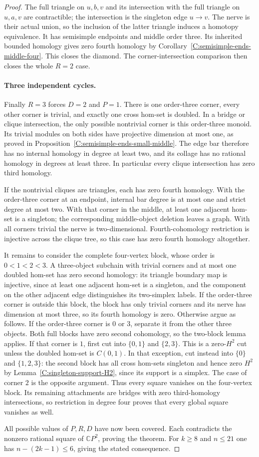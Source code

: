 \begin{proof}
The full triangle on $u,b,v$ and its intersection
with the full triangle on $u,a,v$ are contractible;
the intersection is the singleton edge $u\to v$.
The nerve is their actual union, so the inclusion of
the latter triangle induces a homotopy equivalence.
It has semisimple endpoints and middle order three.
Its inherited bounded homology gives zero fourth
homology by Corollary~\ref{C:semisimple-ends-middle-four}.
This closes the diamond.  The corner-intersection
comparison then closes the whole $R=2$ case.

\paragraph{Three independent cycles.}
Finally $R=3$ forces $D=2$ and $P=1$.  There is one
order-three corner, every other corner is trivial,
and exactly one cross hom-set is doubled.  In a
bridge or clique intersection, the only possible
nontrivial corner is this order-three monoid.
Its trivial modules on both sides have projective
dimension at most one, as proved in
Proposition~\ref{C:semisimple-ends-small-middle}.
The edge bar therefore has no internal homology in
degree at least two, and its collage has no rational
homology in degrees at least three.  In particular
every clique intersection has zero third homology.

If the nontrivial cliques are triangles, each has
zero fourth homology.  With the order-three corner
at an endpoint, internal bar degree is at most one
and strict degree at most two.  With that corner
in the middle, at least one adjacent hom-set is a
singleton; the corresponding middle-object deletion
leaves a graph.  With all corners trivial the nerve
is two-dimensional.  Fourth-cohomology restriction
is injective across the clique tree, so this case
has zero fourth homology altogether.

It remains to consider the complete four-vertex
block, whose order is $0<1<2<3$.  A three-object
subchain with trivial corners and at most one doubled
hom-set has zero second homology: its triangle
boundary map is injective, since at least one
adjacent hom-set is a singleton, and the component
on the other adjacent edge distinguishes its
two-simplex labels.
If the order-three corner is outside this block, the
block has only trivial corners and its nerve has
dimension at most three, so its fourth homology is zero.
Otherwise argue as follows.
If the order-three corner is $0$ or $3$, separate
it from the other three objects.  Both full blocks
have zero second cohomology, so the two-block lemma
applies.
If that corner is $1$, first cut into $\{0,1\}$ and
$\{2,3\}$.  This is a zero-$H^2$ cut unless the
doubled hom-set is $C(0,1)$.  In that exception, cut
instead into $\{0\}$ and $\{1,2,3\}$: the second
block has all cross hom-sets singleton and hence
zero $H^2$ by Lemma~\ref{C:singleton-support-H2},
since its support is a simplex.  The case of corner
$2$ is the opposite argument.  Thus every square
vanishes on the four-vertex block.  Its remaining
attachments are bridges with zero third-homology
intersections, so restriction in degree four proves
that every global square vanishes as well.

All possible values of $P,R,D$ have now been covered.
Each contradicts the nonzero rational square of
$\mathbb CP^2$, proving the theorem.  For $k\geq8$
and $n\leq21$ one has $n-(2k-1)\leq6$, giving the
stated consequence.
\end{proof}
